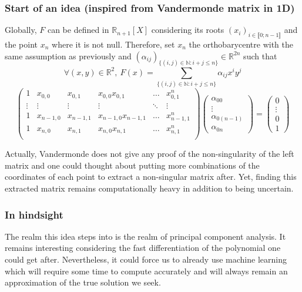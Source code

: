 \documentclass{article}
\theoremstyle{definition}
\theoremstyle{property}
\theoremstyle{remark}
\begin{document}
	\subsubsection*{Start of an idea (inspired from Vandermonde matrix in 1D)}
	Globally, $F$ can be defined in $\mathbb{R}_{n+1}[X]$ considering its roots $(x_i)_{i\in \llbracket0;n-1\rrbracket }$ and the point $x_n$ where it is not null. Therefore, set $x_n$ the orthobarycentre with the same assumption as previously 	and $(\alpha_{ij})_{\{(i,j)\in\mathbb{N}:i+j\leq n\}}\in\mathbb{R}^{2n}$ such that
	\begin{equation*}
		\forall (x,y) \in \mathbb{R}^2,~F(x) = \sum_{\{(i,j)\in\mathbb{N}:i+j\leq n\}} \alpha_{ij}x^iy^j
	\end{equation*}
	\begin{equation*}
		\begin{pmatrix}
			1 & x_{0,0} & x_{0,1} & x_{0,0}x_{0,1} & \dots & x_{0,1}^{n} \\
			\vdots & \vdots&\vdots & \vdots& \ddots & \vdots \\
			1 & x_{n-1,0} & x_{n-1,1} & x_{n-1,0}x_{n-1,1} & \dots &x_{n-1,1}^{n} \\
			1 & x_{n,0} & x_{n,1} & x_{n,0}x_{n,1} & \dots & x_{n,1}^{n} \\
		\end{pmatrix}
		\begin{pmatrix}
			\alpha_{00}\\
			\vdots\\
			\alpha_{0(n-1)}\\
			\alpha_{0n}
		\end{pmatrix}
		=
		\begin{pmatrix}
			0\\
			\vdots\\
			0\\
			1
		\end{pmatrix}
	\end{equation*}

	Actually, Vandermonde does not give any proof of the non-singularity of the left matrix and one could thought about putting more combinations of the coordinates of each point to extract a non-singular matrix after.
	Yet, finding this extracted matrix remains computationally heavy in addition to being uncertain.\\
	
	\subsubsection*{In hindsight}
	The realm this idea steps into is the realm of principal component analysis. It remains interesting considering the fast differentiation of the polynomial one could get after. Nevertheless, it could force us to already use machine learning which will require some time to compute accurately and will always remain an approximation of the true solution we seek.
\end{document}
